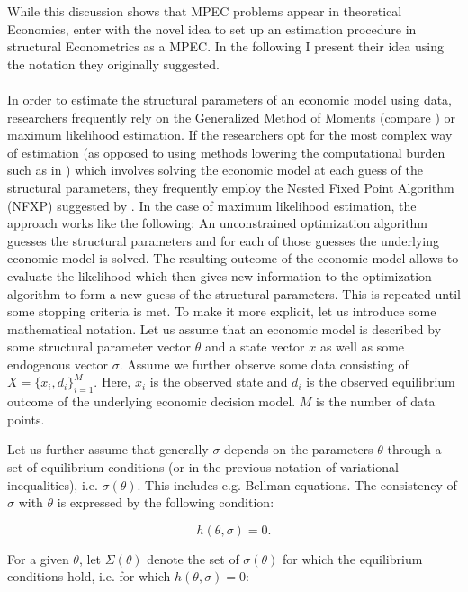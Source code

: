 While this discussion shows that MPEC problems appear in theoretical Economics, \cite{Su.Judd.2012} enter with the novel idea to set up an estimation procedure in structural Econometrics as a MPEC. In the following I present their idea using the notation they originally suggested.

\paragraph{}
In order to estimate the structural parameters of an economic model using data, researchers frequently rely on the Generalized Method of Moments (compare \cite{Hansen.1982}) or maximum likelihood estimation. If the researchers opt for the most complex way of estimation (as opposed to using methods lowering the computational burden such as in \cite{Hotz.Miller.1993}) which involves solving the economic model at each guess of the structural parameters, they frequently employ the Nested Fixed Point Algorithm (NFXP) suggested by \cite{Rust.1987}. In the case of maximum likelihood estimation, the approach works like the following: An unconstrained optimization algorithm guesses the structural parameters and for each of those guesses the underlying economic model is solved. The resulting outcome of the economic model allows to evaluate the likelihood which then gives new information to the optimization algorithm to form a new guess of the structural parameters. This is repeated until some stopping criteria is met. To make it more explicit, let us introduce some mathematical notation. Let us assume that an economic model is described by some structural parameter vector $\theta$ and a state vector $x$ as well as some endogenous vector $\sigma$. Assume we further observe some data consisting of $X = \{x_i, d_i\}^M_{i=1}$. Here, $x_i$ is the observed state and $d_i$ is the observed equilibrium outcome of the underlying economic decision model. $M$ is the number of data points.

Let us further assume that generally $\sigma$ depends on the parameters $\theta$ through a set of equilibrium conditions (or in the previous notation of variational inequalities), i.e. $\sigma(\theta)$. This includes e.g. Bellman equations. The consistency of $\sigma$ with $\theta$ is expressed by the following condition:

\begin{equation}
h(\theta, \sigma) = 0.
\end{equation}

For a given $\theta$, let $\Sigma(\theta)$ denote the set of $\sigma(\theta)$ for which the equilibrium conditions hold, i.e. for which $h(\theta,\sigma)=0$:

